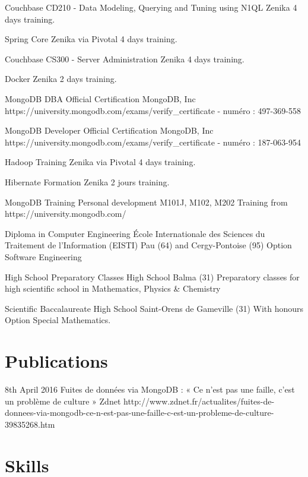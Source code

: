 \documentclass[11pt,a4paper]{moderncv}
\begin{document}
{Couchbase CD210 - Data Modeling, Querying and Tuning using N1QL}
{Zenika}
{}
{}
{4 days training.}

{Spring Core}
{Zenika via Pivotal}
{}
{}
{4 days training.}

{Couchbase CS300 - Server Administration}
{Zenika}
{}
{}
{4 days training.}

{Docker}
{Zenika}
{}
{}
{2 days training.}

{MongoDB DBA Official Certification}
{MongoDB, Inc}
{}
{}
{https://university.mongodb.com/exams/verify\_certificate - numéro : 497-369-558}

{MongoDB Developer Official Certification}
{MongoDB, Inc}
{}
{}
{https://university.mongodb.com/exams/verify\_certificate - numéro : 187-063-954}

{Hadoop Training}
{Zenika via Pivotal}
{}
{}
{4 days training.}

{Hibernate Formation}
{Zenika}
{}
{}
{2 jours training.}

{MongoDB Training}
{Personal development}
{}
{}
{M101J, M102, M202 Training from https://university.mongodb.com/}

{Diploma in Computer Engineering}
{\'Ecole Internationale des Sciences du Traitement de l’Information (EISTI)}
{Pau (64) and Cergy-Pontoise (95)}
{}
{Option Software Engineering}

{High School Preparatory Classes}
{High School}
{Balma (31)}
{}
{Preparatory classes for high scientific school in Mathematics, Physics \& Chemistry}

{Scientific Baccalaureate}
{High School}
{Saint-Orens de Gameville (31)}
{With honours}
{Option Special Mathematics.}

\section{Publications}
\cventry
{8th April 2016}
{Fuites de données via MongoDB : « Ce n’est pas une faille, c’est un problème de culture »}
{}
{Zdnet}
{}
{http://www.zdnet.fr/actualites/fuites-de-donnees-via-mongodb-ce-n-est-pas-une-faille-c-est-un-probleme-de-culture-39835268.htm
}   %


\section{Skills}
\end{document}
